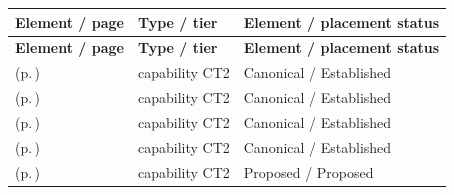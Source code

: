 \begingroup\small\setlength{\TableWidth}{\dimexpr\linewidth-6\tabcolsep-4\arrayrulewidth\relax}
\begin{longtable}{|>{\raggedright\arraybackslash}p{0.52\TableWidth}|>{\raggedright\arraybackslash}p{0.2\TableWidth}|>{\raggedright\arraybackslash}p{0.28\TableWidth}|}
\hline\rowcolor{TableHead}\textbf{Element / page} & \textbf{Type / tier} & \textbf{Element / placement status}\\\hline\endfirsthead
\hline\rowcolor{TableHead}\textbf{Element / page} & \textbf{Type / tier} & \textbf{Element / placement status}\\\hline\endhead
\hline\endfoot
\nameref{cap:bc-care-access-management} (p.\,\pageref{cap:bc-care-access-management}) & capability CT2 & Canonical / Established\\\hline
\nameref{cap:bc-care-scheduling-capacity-management} (p.\,\pageref{cap:bc-care-scheduling-capacity-management}) & capability CT2 & Canonical / Established\\\hline
\nameref{cap:bc-care-coordination-transition} (p.\,\pageref{cap:bc-care-coordination-transition}) & capability CT2 & Canonical / Established\\\hline
\nameref{cap:bc-care-support-logistics-management} (p.\,\pageref{cap:bc-care-support-logistics-management}) & capability CT2 & Canonical / Established\\\hline
\nameref{cap:bc-service-delivery-preparedness-management} (p.\,\pageref{cap:bc-service-delivery-preparedness-management}) & capability CT2 & Proposed / Proposed\\\hline
\end{longtable}\endgroup

